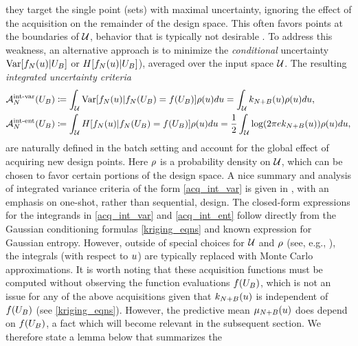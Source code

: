 \documentclass[12pt]{article}
\begin{document}
they target the single point (sets) with maximal uncertainty, ignoring the effect of the acquisition on the remainder of the design space. 
This often favors points at the boundaries of $\parSpace$, behavior that is typically not desirable \cite{gramacy2020surrogates}. 
To address this weakness, an alternative approach is to minimize the \textit{conditional} uncertainty 
$\Var[\funcEm[\Ndesign](\Par) | \designBatchIn]$ or $\Ent[\funcEm[\Ndesign](\Par) | \designBatchIn]$), averaged over 
the input space $\parSpace$. The resulting \textit{integrated uncertainty criteria}
\begin{align}
\labelAcq[\Ndesign]{\intvarLabel}(\designBatchIn)
&\Def \int_{\parSpace} \Var[\funcEm[\Ndesign](\Par) | \funcEm(\designBatchIn)=\func(\designBatchIn)] \weightDens(\Par) d\Par
= \int_{\parSpace} \gpKer[\Naugment](\Par) \weightDens(\Par) d\Par, \label{acq_int_var} \\ 
\labelAcq[\Ndesign]{\intentLabel}(\designBatchIn)
&\Def \int_{\parSpace} \Ent[\funcEm[\Ndesign](\Par) | \funcEm(\designBatchIn)=\func(\designBatchIn)] \weightDens(\Par) d\Par
= \frac{1}{2} \int_{\parSpace} \log(2\pi e \gpKer[\Naugment](\Par)) \weightDens(\Par) d\Par, \label{acq_int_ent}
\end{align}
are naturally defined in the batch setting and account for the global effect of acquiring new design points. Here $\weightDens$ is 
a probability density on $\parSpace$, which can be chosen to favor certain portions of the design space. 
A nice summary and analysis of integrated variance criteria of the form \ref{acq_int_var} is given 
in \cite{Mercer_kernels_IVAR}, with an emphasis on one-shot, rather than sequential, design. 
The closed-form expressions for the integrands in \ref{acq_int_var} and \ref{acq_int_ent} follow directly from the Gaussian conditioning 
formulas \ref{kriging_eqns} and known expression for Gaussian entropy. 
However, outside of special choices for $\parSpace$ and 
$\weightDens$ (see, e.g., \cite{Binois_2018}), the integrals (with respect to $\Par$) are typically replaced with Monte Carlo 
approximations. It is worth noting that 
these acquisition functions must be computed without observing the function evaluations $\func(\designBatchIn)$, which is 
not an issue for any of the above acquisitions given that $\gpKer[\Naugment](\Par)$ is independent of $\func(\designBatchIn)$ 
(see \ref{kriging_eqns}). However, the predictive mean $\gpMean[\Naugment](\Par)$ does depend on $\func(\designBatchIn)$, 
a fact which will become relevant in the subsequent section. We therefore state a lemma below that summarizes the 
\end{document}
